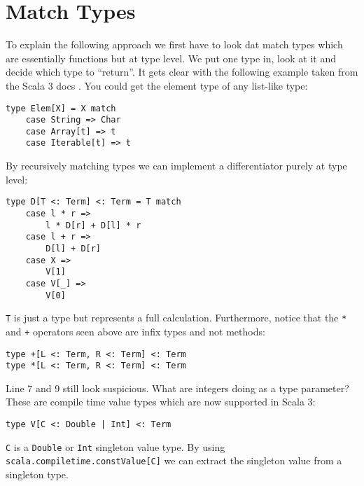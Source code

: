 \section{Match Types} \label{sec:matchTypes}
To explain the following approach we first have to look dat match types which are essentially functions but at type level. We put one type in, look at it and decide which type to ``return''. It gets clear with the following example taken from the Scala 3 docs \cite{matchTypesScala3}. You could get the element type of any list-like type:
\begin{lstlisting}
type Elem[X] = X match
    case String => Char
    case Array[t] => t
    case Iterable[t] => t
\end{lstlisting}
By recursively matching types we can implement a differentiator purely at type level:
\begin{lstlisting}
type D[T <: Term] <: Term = T match
    case l * r => 
        l * D[r] + D[l] * r
    case l + r => 
        D[l] + D[r]
    case X => 
        V[1]
    case V[_] => 
        V[0]
\end{lstlisting}
\lstinline{T} is just a type but represents a full calculation. Furthermore, notice that the \lstinline{*} and \lstinline{+} operators seen above are infix types and not methods:
\begin{lstlisting}
type +[L <: Term, R <: Term] <: Term
type *[L <: Term, R <: Term] <: Term
\end{lstlisting}
Line 7 and 9 still look suspicious. What are integers doing as a type parameter? These are compile time value types which are now supported in Scala 3:
\begin{lstlisting}
type V[C <: Double | Int] <: Term
\end{lstlisting}
\lstinline{C} is a \lstinline{Double} or \lstinline{Int} singleton value type. By using \lstinline{scala.compiletime.constValue[C]} we can extract the singleton value from a singleton type.

